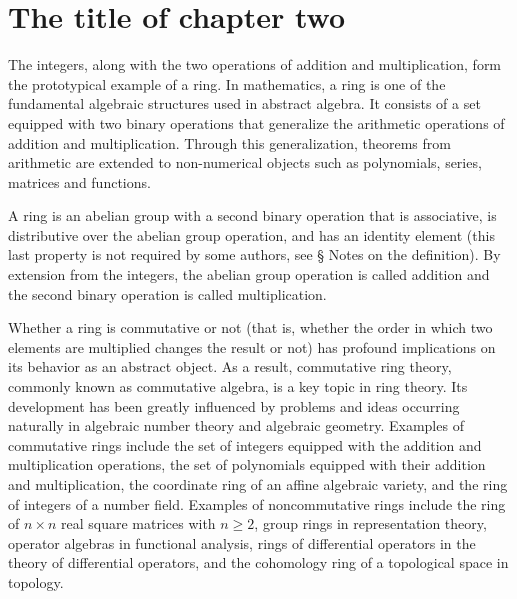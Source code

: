 
\chapter{The title of chapter two}


The integers, along with the two operations of addition and
multiplication, form the prototypical example of a ring.  In
mathematics, a ring is one of the fundamental algebraic structures
used in abstract algebra. It consists of a set equipped with two
binary operations that generalize the arithmetic operations of
addition and multiplication. Through this generalization, theorems
from arithmetic are extended to non-numerical objects such as
polynomials, series, matrices and functions.

A ring is an abelian group with a second binary operation that is
associative, is distributive over the abelian group operation, and has
an identity element (this last property is not required by some
authors, see § Notes on the definition). By extension from the
integers, the abelian group operation is called addition and the
second binary operation is called multiplication.

Whether a ring is commutative or not (that is, whether the order in which two elements are multiplied changes the result or not) has profound implications on its behavior as an abstract object. As a result, commutative ring theory, commonly known as commutative algebra, is a key topic in ring theory. Its development has been greatly influenced by problems and ideas occurring naturally in algebraic number theory and algebraic geometry. Examples of commutative rings include the set of integers equipped with the addition and multiplication operations, the set of polynomials equipped with their addition and multiplication, the coordinate ring of an affine algebraic variety, and the ring of integers of a number field. Examples of noncommutative rings include the ring of \(n \times n\) real square matrices with \(n \geq 2\), group rings in representation theory, operator algebras in functional analysis, rings of differential operators in the theory of differential operators, and the cohomology ring of a topological space in topology.